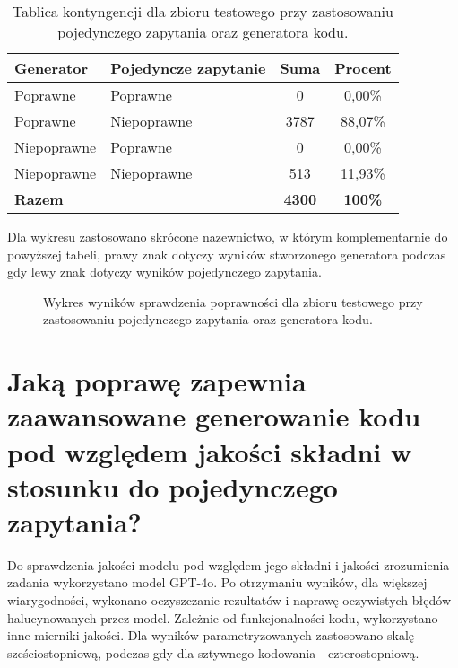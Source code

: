 \begin{table}[ht]
\caption{Tablica kontyngencji dla zbioru testowego przy zastosowaniu pojedynczego zapytania oraz generatora kodu.}\label{tab:tabela11}
\centering%
\begin{tabular}{|l|l|c|c|}
\hline
\textbf{Generator} & \textbf{Pojedyncze zapytanie} & \textbf{Suma} & \textbf{Procent} \\
\hline
Poprawne & Poprawne & 0 & 0,00\% \\
\hline
Poprawne & Niepoprawne & 3787 & 88,07\% \\
\hline
Niepoprawne & Poprawne & 0 & 0,00\% \\
\hline
Niepoprawne & Niepoprawne & 513 & 11,93\% \\
\hline
\textbf{Razem} & & \textbf{4300} & \textbf{100\%} \\
\hline
\end{tabular}
\end{table}

Dla wykresu zastosowano skrócone nazewnictwo, w którym komplementarnie do powyższej tabeli, prawy znak dotyczy wyników stworzonego generatora podczas gdy lewy znak dotyczy wyników pojedynczego zapytania.

\begin{figure}[H]
\centering
{}
\caption{Wykres wyników sprawdzenia poprawności dla zbioru testowego przy zastosowaniu pojedynczego zapytania oraz generatora kodu.}\label{rys:plama2k}
\end{figure}

\section{Jaką poprawę zapewnia zaawansowane generowanie kodu pod względem jakości składni w stosunku do pojedynczego zapytania?}

Do sprawdzenia jakości modelu pod względem jego składni i jakości zrozumienia zadania wykorzystano model GPT-4o. Po otrzymaniu wyników, dla większej wiarygodności, wykonano oczyszczanie rezultatów i naprawę oczywistych błędów halucynowanych przez model. Zależnie od funkcjonalności kodu, wykorzystano inne mierniki jakości. Dla wyników parametryzowanych zastosowano skalę sześciostopniową, podczas gdy dla sztywnego kodowania - czterostopniową.


